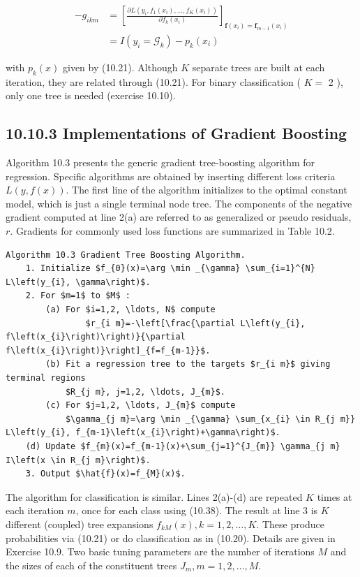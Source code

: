 \documentclass[10pt]{article}
\begin{document}
\begin{align*}
-g_{i k m} & =\left[\frac{\partial L\left(y_{i}, f_{1}\left(x_{i}\right), \ldots, f_{K}\left(x_{i}\right)\right)}{\partial f_{k}\left(x_{i}\right)}\right]_{\mathbf{f}\left(x_{i}\right)=\mathbf{f}_{m-1}\left(x_{i}\right)} \\
& =I\left(y_{i}=\mathcal{G}_{k}\right)-p_{k}\left(x_{i}\right) \tag{10.38}
\end{align*}


with $p_{k}(x)$ given by (10.21). Although $K$ separate trees are built at each iteration, they are related through (10.21). For binary classification ( $K=$ 2 ), only one tree is needed (exercise 10.10).

\subsection*{10.10.3 Implementations of Gradient Boosting}
Algorithm 10.3 presents the generic gradient tree-boosting algorithm for regression. Specific algorithms are obtained by inserting different loss criteria $L(y, f(x))$. The first line of the algorithm initializes to the optimal constant model, which is just a single terminal node tree. The components of the negative gradient computed at line 2(a) are referred to as generalized or pseudo residuals, $r$. Gradients for commonly used loss functions are summarized in Table 10.2.

\begin{verbatim}
Algorithm 10.3 Gradient Tree Boosting Algorithm.
    1. Initialize $f_{0}(x)=\arg \min _{\gamma} \sum_{i=1}^{N} L\left(y_{i}, \gamma\right)$.
    2. For $m=1$ to $M$ :
        (a) For $i=1,2, \ldots, N$ compute
                $r_{i m}=-\left[\frac{\partial L\left(y_{i}, f\left(x_{i}\right)\right)}{\partial f\left(x_{i}\right)}\right]_{f=f_{m-1}}$.
        (b) Fit a regression tree to the targets $r_{i m}$ giving terminal regions
            $R_{j m}, j=1,2, \ldots, J_{m}$.
        (c) For $j=1,2, \ldots, J_{m}$ compute
            $\gamma_{j m}=\arg \min _{\gamma} \sum_{x_{i} \in R_{j m}} L\left(y_{i}, f_{m-1}\left(x_{i}\right)+\gamma\right)$.
    (d) Update $f_{m}(x)=f_{m-1}(x)+\sum_{j=1}^{J_{m}} \gamma_{j m} I\left(x \in R_{j m}\right)$.
    3. Output $\hat{f}(x)=f_{M}(x)$.
\end{verbatim}

The algorithm for classification is similar. Lines 2(a)-(d) are repeated $K$ times at each iteration $m$, once for each class using (10.38). The result at line 3 is $K$ different (coupled) tree expansions $f_{k M}(x), k=1,2, \ldots, K$. These produce probabilities via (10.21) or do classification as in (10.20). Details are given in Exercise 10.9. Two basic tuning parameters are the number of iterations $M$ and the sizes of each of the constituent trees $J_{m}, m=1,2, \ldots, M$.
\end{document}
